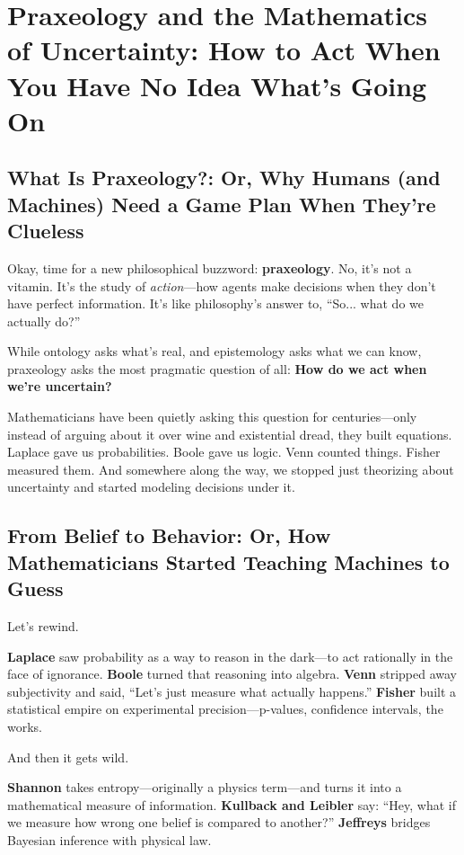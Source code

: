 \section{Praxeology and the Mathematics of Uncertainty: How to Act When You Have No Idea What’s Going On}

\subsection{What Is Praxeology?: Or, Why Humans (and Machines) Need a Game Plan When They’re Clueless}

Okay, time for a new philosophical buzzword: \textbf{praxeology}. No, it’s not a vitamin. It’s the study of \emph{action}—how agents make decisions when they don’t have perfect information. It’s like philosophy’s answer to, “So... what do we actually do?”

While ontology asks what’s real, and epistemology asks what we can know, praxeology asks the most pragmatic question of all:  
\textbf{How do we act when we’re uncertain?}

Mathematicians have been quietly asking this question for centuries—only instead of arguing about it over wine and existential dread, they built equations. Laplace gave us probabilities. Boole gave us logic. Venn counted things. Fisher measured them. And somewhere along the way, we stopped just theorizing about uncertainty and started modeling decisions under it.

\subsection{From Belief to Behavior: Or, How Mathematicians Started Teaching Machines to Guess}

Let’s rewind.

\textbf{Laplace} saw probability as a way to reason in the dark—to act rationally in the face of ignorance.  
\textbf{Boole} turned that reasoning into algebra.  
\textbf{Venn} stripped away subjectivity and said, “Let’s just measure what actually happens.”  
\textbf{Fisher} built a statistical empire on experimental precision—p-values, confidence intervals, the works.

And then it gets wild.

\textbf{Shannon} takes entropy—originally a physics term—and turns it into a mathematical measure of information.  
\textbf{Kullback and Leibler} say: “Hey, what if we measure how wrong one belief is compared to another?”  
\textbf{Jeffreys} bridges Bayesian inference with physical law.

